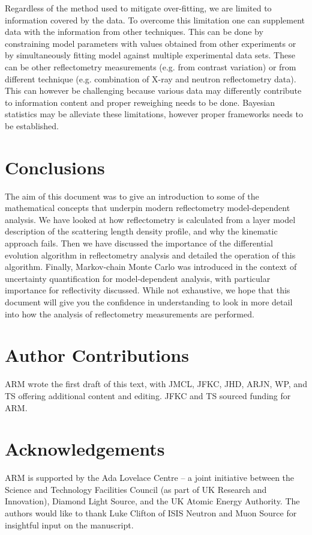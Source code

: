 \documentclass[
 reprint,
 superscriptaddress,
 amsmath,amssymb,
 aps,
]{revtex4-1}
\begin{document}
Regardless of the method used to mitigate over-fitting, we are limited to information covered by the data. To overcome this limitation one can supplement data with the information from other techniques. This can be done by constraining model parameters with values obtained from other experiments or by simultaneously fitting model against multiple experimental data sets. These can be other reflectometry measurements (e.g. from contrast variation) or from different technique (e.g. combination of X-ray and neutron reflectometry data). This can however be challenging because various data may differently contribute to information content and proper reweighing needs to be done. Bayesian statistics may be alleviate these limitations, however proper frameworks needs to be established.   
 
\section{Conclusions}
The aim of this document was to give an introduction to some of the mathematical concepts that underpin modern reflectometry model-dependent analysis.
We have looked at how reflectometry is calculated from a layer model description of the scattering length density profile, and why the kinematic approach fails.
Then we have discussed the importance of the differential evolution algorithm in reflectometry analysis and detailed the operation of this algorithm.
Finally, Markov-chain Monte Carlo was introduced in the context of uncertainty quantification for model-dependent analysis, with particular importance for reflectivity discussed.
While not exhaustive, we hope that this document will give you the confidence in understanding to look in more detail into how the analysis of reflectometry measurements are performed.

\section*{Author Contributions}
ARM wrote the first draft of this text, with JMCL, JFKC, JHD, ARJN, WP, and TS offering additional content and editing.
JFKC and TS sourced funding for ARM.


\section*{Acknowledgements}
ARM is supported by the Ada Lovelace Centre -- a joint initiative between the Science and Technology Facilities Council (as part of UK Research and Innovation), Diamond Light Source, and the UK Atomic Energy Authority.
The authors would like to thank Luke Clifton of ISIS Neutron and Muon Source for insightful input on the manuscript.




\end{document}

